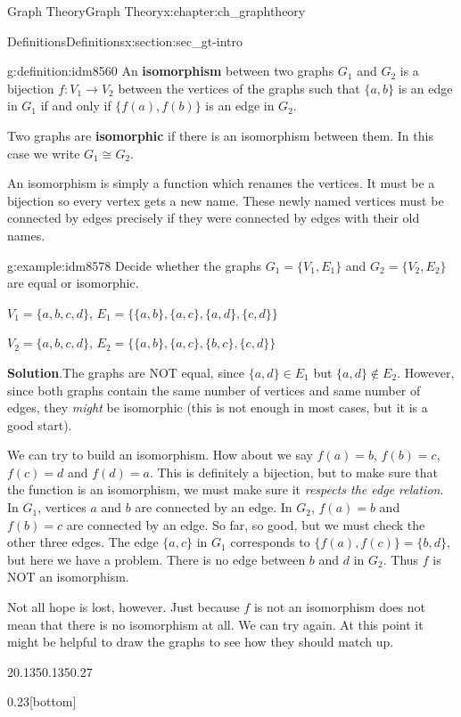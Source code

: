 \documentclass[oneside,10pt,]{book}
\newcommand{\terminology}[1]{\textbf{#1}}
\numberwithin{equation}{chapter}
\def\isom{\cong}
\begin{document}
\begin{chapterptx}{Graph Theory}{}{Graph Theory}{}{}{x:chapter:ch_graphtheory}
\begin{sectionptx}{Definitions}{}{Definitions}{}{}{x:section:sec_gt-intro}
\begin{definition}{}{g:definition:idm8560}%
 An \terminology{isomorphism} between two graphs \(G_1\) and \(G_2\) is a bijection \(f:V_1 \to V_2\) between the vertices of the graphs such that \(\{a,b\}\) is an edge in \(G_1\) if and only if \(\{f(a), f(b)\}\) is an edge in \(G_2\).%
\par
Two graphs are \terminology{isomorphic} if there is an isomorphism between them. In this case we write \(G_1 \isom G_2\).%
\end{definition}
An isomorphism is simply a function which renames the vertices. It must be a bijection so every vertex gets a new name. These newly named vertices must be connected by edges precisely if they were connected by edges with their old names.%
\begin{example}{}{g:example:idm8578}%
Decide whether the graphs \(G_1 = \{V_1, E_1\}\) and \(G_2 = \{V_2, E_2\}\) are equal or isomorphic.%
\par
\(V_1 = \{a,b,c,d\}\), \(E_1 = \{\{a,b\}, \{a,c\}, \{a,d\}, \{c,d\}\}\)%
\par
\(V_2 = \{a,b,c,d\}\), \(E_2 = \{\{a,b\}, \{a,c\}, \{b,c\}, \{c,d\}\}\)%
\par\smallskip%
\noindent\textbf{Solution}.\hypertarget{g:solution:idm8589}{}\quad{}The graphs are NOT equal, since \(\{a,d\} \in E_1\) but \(\{a,d\} \notin E_2\). However, since both graphs contain the same number of vertices and same number of edges, they \emph{might} be isomorphic (this is not enough in most cases, but it is a good start).%
\par
We can try to build an isomorphism. How about we say \(f(a) = b\), \(f(b) = c\), \(f(c) = d\) and \(f(d) = a\). This is definitely a bijection, but to make sure that the function is an isomorphism, we must make sure it \emph{respects the edge relation}. In \(G_1\), vertices \(a\) and \(b\) are connected by an edge. In \(G_2\), \(f(a) = b\) and \(f(b) = c\) are connected by an edge. So far, so good, but we must check the other three edges. The edge \(\{a,c\}\) in \(G_1\) corresponds to \(\{f(a), f(c)\} = \{b,d\}\), but here we have a problem. There is no edge between \(b\) and \(d\) in \(G_2\). Thus \(f\) is NOT an isomorphism.%
\par
Not all hope is lost, however. Just because \(f\) is not an isomorphism does not mean that there is no isomorphism at all. We can try again. At this point it might be helpful to draw the graphs to see how they should match up.%
\begin{sidebyside}{2}{0.135}{0.135}{0.27}%
\begin{sbspanel}{0.23}[bottom]%
\end{sbspanel}
\end{sidebyside}
\end{example}
\end{sectionptx}
\end{chapterptx}
\end{document}
